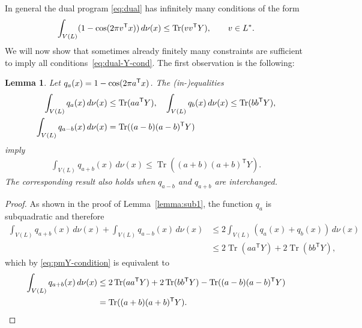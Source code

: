 \documentclass{amsart}
\newtheorem{lemma}[defin]{Lemma}
\DeclareMathOperator{\Tr}{Tr}
\begin{document}
In general the dual program \eqref{eq:dual} has infinitely many conditions of
the form
\begin{align} \label{eq:dual-Y-cond}
	\int_{V(L)} (1-\cos(2\pi v^{\sf T}x))  \, d\nu(x) \le \Tr(vv^{\sf T} Y), \qquad v \in L^*.
\end{align}
We will now show that sometimes already finitely many constraints are
sufficient to imply all conditions~\eqref{eq:dual-Y-cond}.  The first
observation is the following:

\begin{lemma}\label{lemma:dual-simplifiation-by-ineqs}
  Let $ q_a(x) = 1-\cos(2\pi a^{\sf T}x) $. The (in-)equalities
	\begin{align}\label{eq:uvY-condition}
		\int_{V(L)}  q_{a}(x)  \, d\nu(x)  &\le
                                                           \Tr(aa^{\sf T}
                                                           Y), \quad
                                                           \int_{V(L)}
                                                           q_{b}(x) \,
                                                           d\nu(x)
                                                           \le
                                                           \Tr(bb^{\sf T}
                                                           Y),   \\
		\label{eq:pmY-condition}
		\int_{V(L)}  q_{a - b}(x)  \, d\nu(x) &= \Tr((a- b)(a- b)^\mathsf{T}Y)
	\end{align}
	imply
	\begin{align*}
		\int_{V(L)}  q_{a + b}(x)  \, d\nu(x) \le\Tr((a + b)(a + b)^\mathsf{T}Y) .
	\end{align*}
        The corresponding result also holds when $q_{a-b}$ and $q_{a+b}$
        are interchanged.
      \end{lemma}

\begin{proof}
  As shown in the proof of Lemma~\ref{lemma:sub1}, the function $q_a$
  is subquadratic and therefore
	\begin{align*}
		\int_{V(L)}  q_{a+b}(x) \, d\nu(x)  + \int_{V(L)}
          q_{a-b}(x)  \, d\nu(x) &\le 2 \int_{V(L)}  (q_a(x) +q_b(x)) \,
                                   d\nu(x) \\
		&\le 2\Tr(aa^\mathsf{T}Y) + 2 \Tr(bb^\mathsf{T} Y),
	\end{align*}
	which by \eqref{eq:pmY-condition} is equivalent to
	\begin{align*}
			\int_{V(L)}  q_{a+b}(x)  \, d\nu(x)  &\le 2\Tr(aa^\mathsf{T}Y) + 2 \Tr(bb^\mathsf{T} Y) - \Tr((a- b)(a- b)^\mathsf{T}Y)   \\
			& = \Tr((a+b)(a+b)^\mathsf{T} Y).\qedhere
	\end{align*}
\end{proof}
\end{document}
